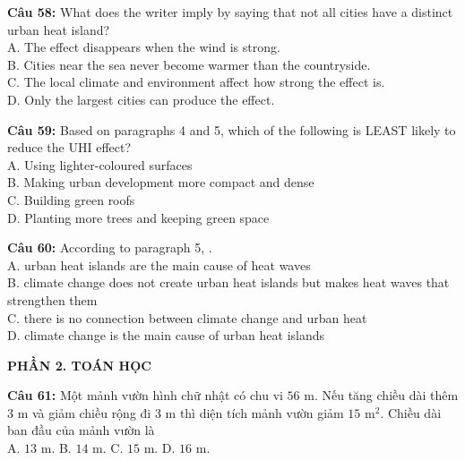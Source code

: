 \documentclass[12pt,a4paper]{article}
\begin{document}

\noindent \textbf{Câu 58:} What does the writer imply by saying that not all cities have a distinct urban heat island?\\
\noindent A. The effect disappears when the wind is strong.\\
\noindent B. Cities near the sea never become warmer than the countryside.\\
\noindent C. The local climate and environment affect how strong the effect is.\\
\noindent D. Only the largest cities can produce the effect.




\noindent \textbf{Câu 59:} Based on paragraphs 4 and 5, which of the following is LEAST likely to reduce the UHI effect?\\
\noindent A. Using lighter-coloured surfaces\\
\noindent B. Making urban development more compact and dense\\
\noindent C. Building green roofs\\
\noindent D. Planting more trees and keeping green space




\noindent \textbf{Câu 60:} According to paragraph 5, \underline{\hspace{1.2cm}}.\\
\noindent A. urban heat islands are the main cause of heat waves\\
\noindent B. climate change does not create urban heat islands but makes heat waves that strengthen them\\
\noindent C. there is no connection between climate change and urban heat\\
\noindent D. climate change is the main cause of urban heat islands


\vspace{0.5cm}
\textbf{PHẦN 2. TOÁN HỌC} \textit{}



\noindent \textbf{Câu 61:} Một mảnh vườn hình chữ nhật có chu vi $56$ m. Nếu tăng chiều dài thêm $3$ m và giảm chiều rộng đi $3$ m thì diện tích mảnh vườn giảm $15$ m$^2$. Chiều dài ban đầu của mảnh vườn là\\
\noindent A. $13$ m. \hfill B. $14$ m. \hfill C. $15$ m. \hfill D. $16$ m.
\end{document}
